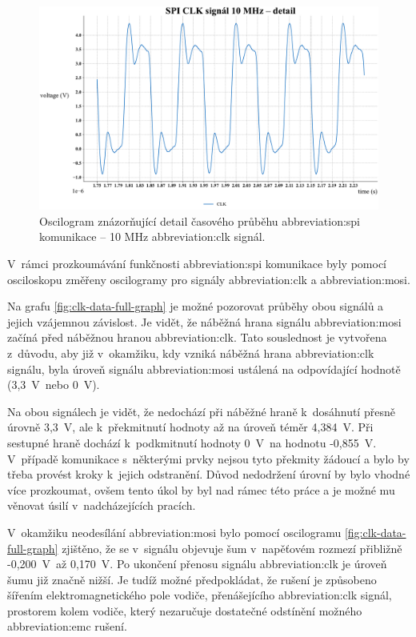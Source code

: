 \documentclass[a4paper, twoside, 11pt]{article}
\newcommand{\fbar}{\FloatBarrier}
\begin{document}
	\begin{figure}[htbp!]
		\centering
		\includegraphics[width=1\textwidth]{src/python-graph/spi-osciloscope-data/pdf/clk-mid-graph.pdf}
		\caption{Oscilogram znázorňující detail časového průběhu \gls{abbreviation:spi} komunikace – 10 MHz \gls{abbreviation:clk} signál.}
		\label{fig:clk-mid-graph}
	\end{figure}


	\fbar
	V~rámci prozkoumávání funkčnosti \gls{abbreviation:spi} komunikace byly pomocí osciloskopu změřeny oscilogramy pro signály \textcolor{ctublue}{\gls{abbreviation:clk}} a \textcolor{ctured}{\gls{abbreviation:mosi}}.\par
	Na grafu \ref{fig:clk-data-full-graph} je možné pozorovat průběhy obou signálů a jejich vzájemnou závislost. Je vidět, že náběžná hrana signálu \gls{abbreviation:mosi} začíná před náběžnou hranou \gls{abbreviation:clk}. Tato souslednost je vytvořena z~důvodu, aby již v~okamžiku, kdy vzniká náběžná hrana \textcolor{ctublue}{\gls{abbreviation:clk}} signálu, byla úroveň signálu \textcolor{ctured}{\gls{abbreviation:mosi}} ustálená na odpovídající hodnotě (3,3~V~nebo 0~V).\par
	Na obou signálech je vidět, že nedochází při náběžné hraně k~dosáhnutí přesně úrovně 3,3~V, ale k~překmitnutí hodnoty až na úroveň téměr 4,384~V. Při sestupné hraně dochází k~podkmitnutí hodnoty 0~V~na hodnotu -0,855~V. V~případě komunikace s~některými prvky nejsou tyto překmity žádoucí a bylo by třeba provést kroky k~jejich odstranění. Důvod nedodržení úrovní by bylo vhodné více prozkoumat, ovšem tento úkol by byl nad rámec této práce a je možné mu věnovat úsilí v~nadcházejících pracích.\par
	V~okamžiku neodesílání \textcolor{ctured}{\gls{abbreviation:mosi}} bylo pomocí oscilogramu \ref{fig:clk-data-full-graph} zjištěno, že se v~signálu objevuje šum v~napěťovém rozmezí přibližně -0,200~V~až 0,170~V. Po ukončení přenosu signálu \textcolor{ctublue}{\gls{abbreviation:clk}} je úroveň šumu již značně nižší. Je tudíž možné předpokládat, že rušení je způsobeno šířením elektromagnetického pole vodiče, přenášejícího \textcolor{ctublue}{\gls{abbreviation:clk}} signál, prostorem kolem vodiče, který nezaručuje dostatečné odstínění možného \gls{abbreviation:emc} rušení.
\end{document}
